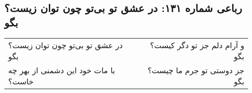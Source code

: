 \begin{center}
\section*{رباعی شماره ۱۳۱: در عشق تو بی‌تو چون توان زیست؟ بگو}
\label{sec:131}
\begin{longtable}{l p{0.5cm} r}
در عشق تو بی‌تو چون توان زیست؟ بگو
&&
و آرام دلم جز تو دگر کیست؟ بگو
\\
با مات خود این دشمنی از بهر چه خاست؟
&&
جز دوستی تو جرم ما چیست؟ بگو
\\
\end{longtable}
\end{center}
